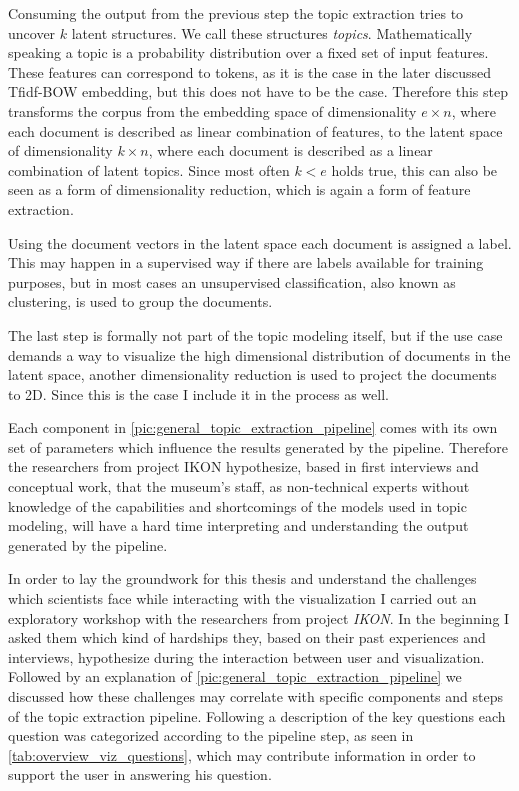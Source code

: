 Consuming the output from the previous step the topic extraction tries to uncover $k$ latent structures. We call these structures \textit{topics}. Mathematically speaking a topic is a probability distribution over a fixed set of input features. \cite{liuOverviewTopicModeling2016} These features can correspond to tokens, as it is the case in the later discussed Tfidf-BOW embedding, but this does not have to be the case. Therefore this step transforms the corpus from the embedding space of dimensionality $e \times n$, where each document is described as linear combination of features, to the latent space of dimensionality $k \times n$, where each document is described as a linear combination of latent topics. Since most often $k < e$ holds true, this can also be seen as a form of dimensionality reduction, which is again a form of feature extraction.

Using the document vectors in the latent space each document is assigned a label. This may happen in a supervised way if there are labels available for training purposes, but in most cases an unsupervised classification, also known as clustering, is used to group the documents.

The last step is formally not part of the topic modeling itself, but if the use case demands a way to visualize the high dimensional distribution of documents in the latent space, another dimensionality reduction is used to project the documents to 2D. Since this is the case I include it in the process as well.

Each component in \autoref{pic:general_topic_extraction_pipeline} comes with its own set of parameters which influence the results generated by the pipeline. Therefore the researchers from project IKON hypothesize, based in first interviews and conceptual work, that the museum's staff, as non-technical experts without knowledge of the capabilities and shortcomings of the models used in topic modeling, will have a hard time interpreting and understanding the output generated by the pipeline. 

In order to lay the groundwork for this thesis and understand the challenges which scientists face while interacting with the visualization I carried out an exploratory workshop with the researchers from project \textit{IKON}. In the beginning I asked them which kind of hardships they, based on their past experiences and interviews, hypothesize during the interaction between user and visualization. Followed by an explanation of \autoref{pic:general_topic_extraction_pipeline} we discussed how these challenges may correlate with specific components and steps of the topic extraction pipeline. Following a description of the key questions each question was categorized according to the pipeline step, as seen in \autoref{tab:overview_viz_questions}, which may contribute information in order to support the user in answering his question.

